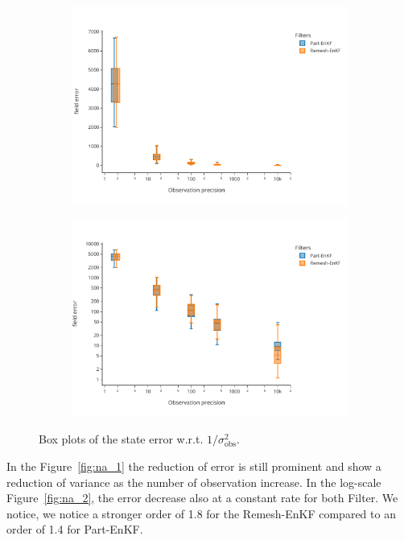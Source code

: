 \begin{figure}[h!]
	\centering
	\begin{subfigure}{0.49\linewidth}
		\includegraphics[width=\linewidth]{./images/app2d/final/MSE_obs_precision_box.pdf}
		\caption{}
		\label{fig:obs_precision_1}
	\end{subfigure}
	\begin{subfigure}{0.49\linewidth}
		\includegraphics[width=\linewidth]{./images/app2d/final/MSE_obs_precision_box_log.pdf}
		\caption{}
		\label{fig:obs_precision_2}
	\end{subfigure}
	\caption{Box plots of the state error w.r.t. $1/\sigma_{\text{obs}}^2$.}
\end{figure}


In the Figure~\ref{fig:na_1} the reduction of error is still prominent and show a reduction of variance as the number of observation increase. In the log-scale Figure~\ref{fig:na_2}, the error decrease also at a constant rate for both Filter. We notice, we notice a stronger order of 1.8 for the Remesh-EnKF compared to an order of 1.4 for Part-EnKF.

